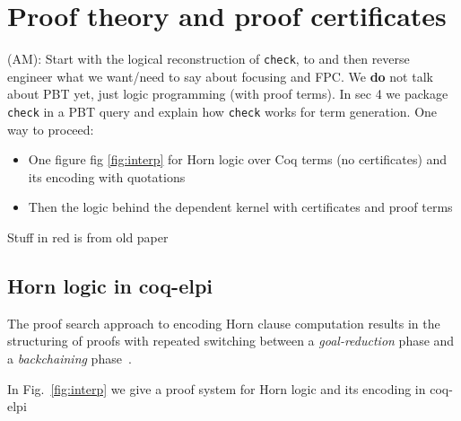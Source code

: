 \newpage
\section{Proof theory and proof certificates}


\begin{metanote}
  (AM): Start with the logical reconstruction of \texttt{check}, to and then reverse engineer what we want/need to say about focusing and FPC. We \textbf{do} not talk about PBT yet, just logic programming (with proof terms). In sec 4 we package \texttt{check} in a PBT query and explain how \texttt{check} works for term generation.
 One way to proceed:
  \begin{itemize}
  \item One figure fig \ref{fig:interp} for Horn logic over Coq terms (no certificates) and its encoding with quotations 
  \item Then the logic behind the dependent kernel with certificates and proof terms
  \end{itemize}

Stuff in red is from old paper
\end{metanote}

\subsection{Horn logic in coq-elpi}


The proof search approach to encoding Horn clause computation
results in the structuring of proofs with repeated
switching between a \emph{goal-reduction} phase and a
\emph{backchaining} phase~\cite{miller91apal}.

In Fig.~\ref{fig:interp} we give a proof system for Horn logic and its encoding in coq-elpi

